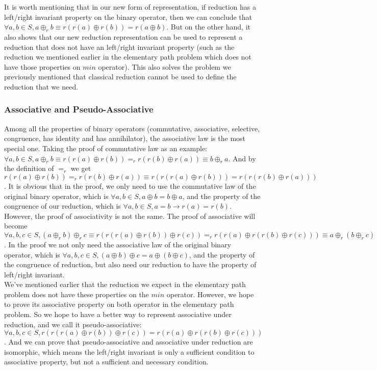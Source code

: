 \documentclass[a4paper,10pt]{article}
\begin{document}
It is worth mentioning that in our new form of representation, if reduction has a left/right invariant property on the binary operator, then we can conclude that $\forall a,b \in S, a \oplus_r b \equiv  r(r (a) \oplus r(b)) = r (a \oplus b)$. 
But on the other hand, it also shows that our new reduction representation can be used to represent a reduction that does not have an left/right invariant property (such as the reduction we mentioned earlier in the elementary path problem which does not have those properties on $min$ operator).
This also solves the problem we previously mentioned that classical reduction cannot be used to define the reduction that we need.\\
\subsubsection{Associative and Pseudo-Associative}
Among all the properties of binary operators 
(commutative, associative, selective, congruence, has identity and has annihilator), the associative law is the most special one. 
Taking the proof of commutative law as an example:\\
$\forall a,b \in S, a \oplus_r b \equiv  r(r (a) \oplus r(b)) =_r r(r (b) \oplus r(a)) \equiv b \oplus_r a$. And by the definition of $=_r$ we get $r(r (a) \oplus r(b)) =_r r(r (b) \oplus r(a)) \equiv r(r(r (a) \oplus r(b))) = r(r(r (b) \oplus r(a)))$. 
It is obvious that in the proof, we only need to use the commutative law of the original binary operator, which is $\forall a,b \in S, a \oplus b = b \oplus a$, and the property of the congruence of our reduction, which is $\forall a,b \in S, a = b \rightarrow r(a) = r(b)$. However, the proof of associativity is not the same. The proof of associative will become $\forall a,b,c \in S, (a \oplus_r b) \oplus_r c  \equiv  r(r(r (a) \oplus r(b)) \oplus r(c)) =_r r(r (a) \oplus r(r(b) \oplus r(c))) \equiv a\oplus_r (b \oplus_r c)$. In the proof we not only need the associative law of the original binary operator, which is $\forall a,b,c \in S, (a\oplus b) \oplus c = a \oplus (b\oplus c)$, and the property of the congruence of reduction, but also need our reduction to have the property of left/right invariant.\\
We've mentioned earlier that the reduction we expect in the elementary path problem does not have these properties on the $min$ operator. However, we hope to prove its associative property on both operator in the elementary path problem. So we hope to have a better way to represent associative under reduction, and we call it pseudo-associative: $\forall a,b,c \in S, r(r(r(a)\oplus r(b)) \oplus r(c)) = r(r(a) \oplus r(r(b)\oplus r(c)))$. And we can prove that pseudo-associative and associative under reduction are isomorphic, which means the left/right invariant is only a sufficient condition to associative property, but not a sufficient and necessary condition.\\
\end{document}

